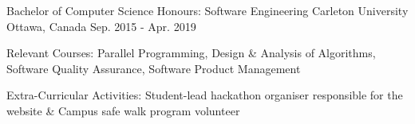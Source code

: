 
\begin{cventries}
	\cventry
		{Bachelor of Computer Science Honours: Software Engineering}
		{Carleton University}
		{Ottawa, Canada}
		{Sep. 2015 - Apr. 2019}
		{\begin{cvitems}
			\item Relevant Courses: Parallel Programming, Design \& Analysis of Algorithms, Software Quality Assurance, Software Product Management
			\item Extra-Curricular Activities: Student-lead hackathon organiser responsible for the website \& Campus safe walk program volunteer
		\end{cvitems}}
\end{cventries}